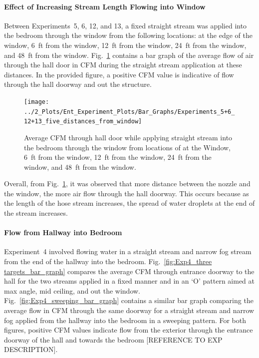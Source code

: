 \documentclass[12pt,oneside]{book}
\begin{document}
\FloatBarrier

\paragraph{Effect of Increasing Stream Length Flowing into Window} \mbox{}

Between Experiments~5, 6, 12, and 13, a fixed straight stream was applied into the bedroom through the window from the following locations: at the edge of the window, 6~ft from the window, 12~ft from the window, 24~ft from the window, and 48~ft from the window. Fig.~\ref{fig:Exps5_6_12_and_13_bar_graph} contains a bar graph of the average flow of air through the hall door in CFM during the straight stream application at these distances. In the provided figure, a positive CFM value is indicative of flow through the hall doorway and out the structure.

\begin{figure}[!ht]
	\centering
	\texttt{[image: ../2\_Plots/Ent\_Experiment\_Plots/Bar\_Graphs/Experiments\_5+6\_12+13\_five\_distances\_from\_window]}
	\caption{Average CFM through hall door while applying straight stream into the bedroom through the window from locations of at the Window, 6~ft from the window, 12~ft from the window, 24~ft from the window, and 48~ft from the window.}
	\label{fig:Exps5_6_12_and_13_bar_graph}
\end{figure}

Overall, from Fig.~\ref{fig:Exps5_6_12_and_13_bar_graph}, it was observed that more distance between the nozzle and the window, the more air flow through the hall doorway. This occurs because as the length of the hose stream increases, the spread of water droplets at the end of the stream increases. 

\FloatBarrier

\paragraph{Flow from Hallway into Bedroom} \mbox{}

Experiment~4 involved flowing water in a straight stream and narrow fog stream from the end of the hallway into the bedroom. Fig.~\ref{fig:Exp4_three targets_bar_graph} compares the average CFM through entrance doorway to the hall for the two streams applied in a fixed manner and in an `O' pattern aimed at max angle, mid ceiling, and out the window. Fig.~\ref{fig:Exp4_sweeping_bar_graph} contains a similar bar graph comparing the average flow in CFM through the same doorway for a straight stream and narrow fog applied from the hallway into the bedroom in a sweeping pattern. For both figures, positive CFM values indicate flow from the exterior through the entrance doorway of the hall and towards the bedroom [REFERENCE TO EXP DESCRIPTION]. 
\end{document}

